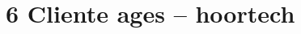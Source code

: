 \hypertarget{__RefHeading___Toc4755_3118176633}{}

\chapter*{6 Cliente ages – hoortech}
\label{cliente-hoortech:text-h-0023}

